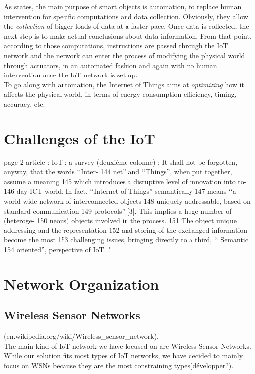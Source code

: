 As \cite{chui2010internet} states, the main purpose of smart objects is automation, to replace human intervention for specific computations and data collection. Obviously, they allow the \textit{collection} of bigger loads of data at a faster pace. Once data is collected, the next step is to make actual conclusions about data information. From that point, according to those computations, instructions are passed through the IoT network and the network can enter the process of modifying the physical world through actuators, in an automated fashion and again with no human intervention once the IoT network is set up.\\

To go along with automation, the Internet of Things aims at \textit{optimizing} how it affects the physical world, in terms of energy consumption efficiency, timing, accuracy, etc.

\section{Challenges of the IoT}

page 2 article : IoT : a survey (deuxième colonne) :
It shall not be forgotten, anyway, that the words ‘‘Inter-
144
net” and ‘‘Things”, when put together, assume a meaning
145
which introduces a disruptive level of innovation into to-
146
day ICT world. In fact, ‘‘Internet of Things” semantically
147
means ‘‘a world-wide network of interconnected objects
148
uniquely addressable, based on standard communication
149
protocols”
[3]. This implies a huge number of (heteroge-
150
neous) objects involved in the process.
151
The object unique addressing and the representation
152
and storing of the exchanged information become the most
153
challenging issues, bringing directly to a third, ‘‘
Semantic
154
oriented”, perspective of IoT. "
\section{Network Organization}

\subsection{Wireless Sensor Networks}

(en.wikipedia.org/wiki/Wireless\_sensor\_network),\\

The main kind of IoT network we have focused on are Wireless Sensor Networks. While our solution fits most types of IoT networks, we have decided to mainly focus on WSNs because they are the most constraining types(développer?).\\

